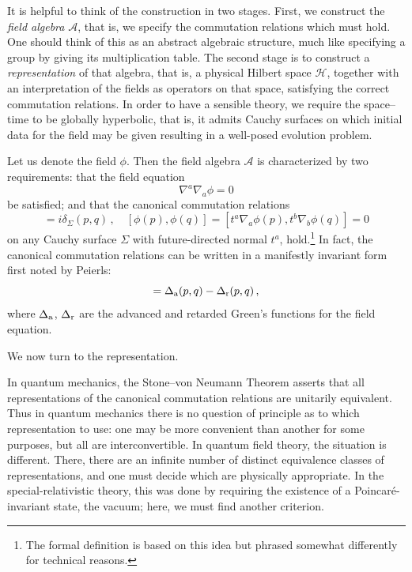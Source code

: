 \documentclass[12pt]{article}
\newcommand{\A}{{\mathcal A}}
\newcommand{\HH}{{\mathcal H}}
\begin{document}
It is helpful to think of the construction in two stages.  First, we construct the {\em field algebra} $\A$, that is, we specify the commutation relations which must hold.  One should think of this as an abstract algebraic structure, much like specifying a group by giving its multiplication table.  The second stage is to construct a {\em representation} of that algebra, that is, a physical Hilbert space $\HH$, together with an interpretation of the fields as
operators on that space, satisfying the correct commutation relations.
In order to have a sensible theory, we require the space--time to be globally hyperbolic, that is, it admits Cauchy surfaces on which initial data for the field may be given resulting in a
 well-posed evolution problem. 

Let us denote the field $\phi$.  Then the field algebra $\A$ is characterized by two requirements:  that the field equation
\begin{equation}
  \nabla ^a\nabla _a\phi =0
\end{equation}
be satisfied; and that the canonical commutation relations
\begin{equation}
  [t^a\nabla _a\phi (p),\phi (q)] =i\delta _\Sigma (p,q)\, ,\quad
 [\phi (p),\phi (q)]=[t^a\nabla _a\phi (p),t^b\nabla _b\phi (q)]=0
\end{equation}
on any Cauchy surface $\Sigma$ with
future-directed normal $t^a$, hold.\footnote{The formal definition is based on this idea but phrased somewhat differently for technical reasons.}  In fact, the canonical commutation relations can be written in a manifestly invariant form first noted by Peierls:
\begin{equation}
  [\phi (p),\phi (q)] = \Delta _{\rm a}(p,q) -\Delta _{\rm r}(p,q)\, ,
\end{equation}
where $\Delta _{\rm a}$, $\Delta _{\rm r}$ are the advanced and retarded Green's functions for the field equation.

We now turn to the representation.
 


In quantum mechanics, the Stone--von Neumann Theorem asserts that all representations of the canonical commutation relations are unitarily equivalent.  Thus in quantum mechanics there is no question of principle as to which representation to use:  one may be more convenient than another for some purposes, but all are interconvertible.
In quantum field theory, the situation is different.  There, there are an infinite number of distinct equivalence classes of representations, and one must decide which are physically appropriate.  In the special-relativistic theory, this was done by requiring the existence of a Poincar\'e-invariant state, the vacuum; here, we must find another criterion.
\end{document}
